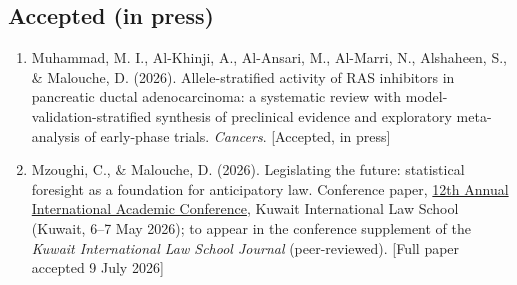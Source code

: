 \documentclass[10pt,a4paper]{article}
\begin{document}
\subsection{Accepted (in press)}
\begin{enumerate}[resume*]
\item Muhammad, M. I., Al-Khinji, A., Al-Ansari, M., Al-Marri, N., Alshaheen, S., \& Malouche, D. (2026). Allele-stratified activity of RAS inhibitors in pancreatic ductal adenocarcinoma: a systematic review with model-validation-stratified synthesis of preclinical evidence and exploratory meta-analysis of early-phase trials. \emph{Cancers}. [Accepted, in press]
\item Mzoughi, C., \& Malouche, D. (2026). Legislating the future: statistical foresight as a foundation for anticipatory law. Conference paper, \href{https://kilaw.edu.kw/annualConference/en/conference-12-call-for-papers/}{12th Annual International Academic Conference}, Kuwait International Law School (Kuwait, 6--7 May 2026); to appear in the conference supplement of the \emph{Kuwait International Law School Journal} (peer-reviewed). [Full paper accepted 9 July 2026]
\end{enumerate}
\end{document}

